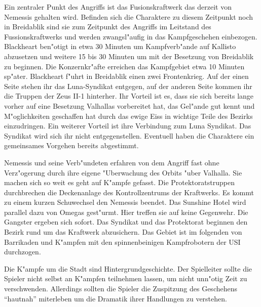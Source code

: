 Ein zentraler Punkt des Angriffs ist das Fusionskraftwerk das derzeit von Nemessis gehalten wird. Befinden sich die Charaktere zu diesem Zeitpunkt noch in Breidablik sind sie zum Zeitpunkt des Angriffs im Leitstand des Fussionskraftwerks und werden zwangsl"aufig in das Kampfgeschehen einbezogen. Blackheart ben"otigt in etwa 30 Minuten um Kampfverb"ande auf Kallisto abzusetzen und weitere 15 bis 30 Minuten um mit der Besetzung von Breidablik zu beginnen. Die Konzernkr"afte erreichen das Kampfgebiet etwa 10 Minuten sp"ater. Blackheart f"uhrt in Breidablik einen zwei Frontenkrieg. Auf der einen Seite stehen ihr das Luna-Syndikat entgegen, auf der anderen Seite kommen ihr die Truppen der Zeus II-1 hinterher. Ihr Vorteil ist es, dass sie sich bereits lange vorher auf eine Besetzung Valhallas vorbereitet hat, das Gel"ande gut kennt und M"oglichkeiten geschaffen hat durch das ewige Eiss in wichtige Teile des Bezirks einzudringen. Ein weiterer Vorteil ist ihre Verbindung zum Luna Syndikat. Das Syndikat wird sich ihr nicht entgegenstellen. Eventuell haben die Charaktere ein gemeinsames Vorgehen bereits abgestimmt.

Nemessis und seine Verb"undeten erfahren von dem Angriff fast ohne Verz"ogerung durch ihre eigene "Uberwachung des Orbits "uber Valhalla. Sie machen sich so weit es geht auf K"ampfe gefasst. Die Protektoratstruppen durchbrechen die Deckenanlage des Kontrollzentrums der Kraftwerks. Es kommt zu einem kurzen Schu\3wechsel den Nemessis beendet. Das Sunshine Hotel wird parallel dazu von Omegas gest"urmt. Hier treffen sie auf keine Gegenwehr. Die Gangster ergeben sich sofort. Das Syndikat und das Protektorat beginnen den Bezirk rund um das Kraftwerk abzusichern. Das Gebiet ist im folgenden von Barrikaden und K"ampfen mit den spinnenbeinigen Kampfrobotern der USI durchzogen.

\begin{remarks}
	Die K"ampfe um die Stadt sind Hintergrundgeschichte. Der Spielleiter sollte die Spieler nicht selbst an K"ampfen teilnehmen lassen, um nicht unn"otig Zeit zu verschwenden. Allerdings sollten die Spieler die Zuspitzung des Geschehens "`hautnah"' miterleben um die Dramatik ihrer Handlungen zu verstehen.
\end{remarks}

